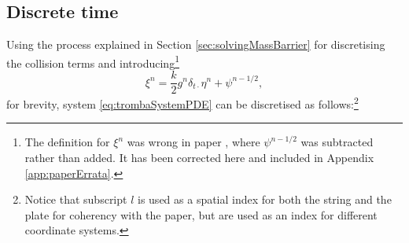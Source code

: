 \subsection{Discrete time}
Using the process explained in Section \ref{sec:solvingMassBarrier} for discretising the collision terms and introducing\footnote{The definition for $\xi^n$ was wrong in paper \citeP[D], where $\psi^{n-1/2}$ was subtracted rather than added. It has been corrected here and included in Appendix \ref{app:paperErrata}.} 
\begin{equation}
    \xi^n = \frac{k}{2}g^n\delta_{t\cdot}\eta^n + \psi^{n-1/2},
\end{equation}
for brevity, system \eqref{eq:trombaSystemPDE} can be discretised as follows:\footnote{Notice that subscript $l$ is used as a spatial index for both the string and the plate for coherency with the paper, but are used as an index for different coordinate systems.}

